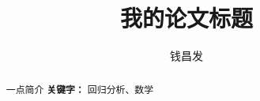 \documentclass{ctexart}
\author{钱昌发}
\title{我的论文标题}
\begin{document}
	\maketitle
	\newpage
	\begin{abstract}
		一点简介
		\newline
		\centering
		\textbf{关键字：} 回归分析、数学
	\end{abstract}
    
    
\end{document}
